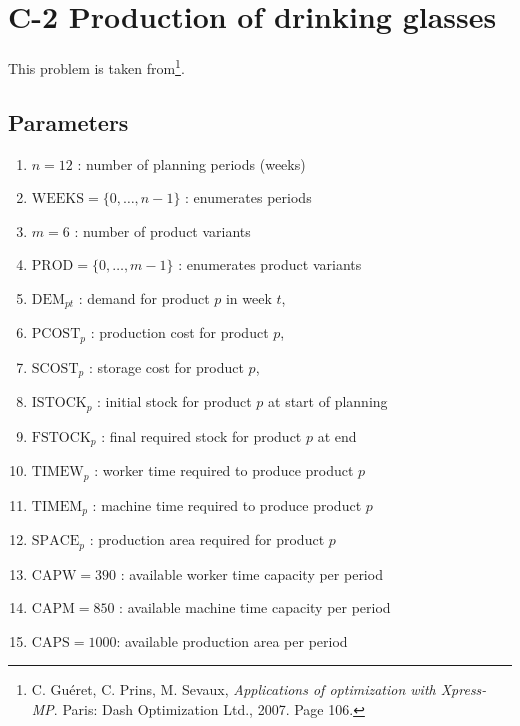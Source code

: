 \documentclass[8pt,oneside]{extarticle}
\begin{document}
\clearpage

\section{C-2 Production of drinking glasses}

This problem is taken from\footnote{C. Guéret, C. Prins, M. Sevaux, \textit{Applications of optimization with Xpress-MP}. %
Paris: Dash Optimization Ltd., 2007. Page 106.}.

\subsection{Parameters}

\begin{enumerate}

    \item $n=12$ : number of planning periods (weeks)
    \item $\mathrm{WEEKS} = \lbrace 0,\ldots, n-1\rbrace$ : enumerates periods
    \item $m = 6$ : number of product variants
    \item $\mathrm{PROD} = \lbrace 0, \ldots, m-1\rbrace$ : enumerates product variants
    
    \item $\mathrm{DEM}_{pt}$ : demand for product $p$ in week $t$,
    \item $\mathrm{PCOST}_{p}$ : production cost for product $p$,
    \item $\mathrm{SCOST}_{p}$ : storage cost for product $p$,
    \item $\mathrm{ISTOCK}_{p}$ : initial stock for product $p$ at start of planning
    \item $\mathrm{FSTOCK}_{p}$ : final required stock for product $p$ at end
    \item $\mathrm{TIMEW}_{p}$ : worker time required to produce product $p$
    \item $\mathrm{TIMEM}_{p}$ : machine time required to produce product $p$
    \item $\mathrm{SPACE}_{p}$ : production area required for product $p$
    \item $\mathrm{CAPW} = 390$ : available worker time capacity per period
    \item $\mathrm{CAPM} = 850$ : available machine time capacity per period
    \item $\mathrm{CAPS} = 1000$: available production area per period
\end{enumerate}
\end{document}
